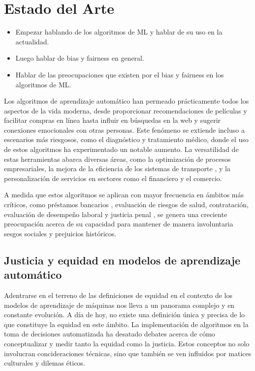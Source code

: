 \chapter{Estado del Arte}\label{chapter:state-of-the-art}

\begin{itemize}
    \item Empezar hablando de los algoritmos de ML y hablar de su uso en la actualidad.
    \item Luego hablar de bias y fairness en general.
    \item Hablar de las preocupaciones que existen por el bias y fairness en los algoritmos de ML.
\end{itemize}

Los algoritmos de aprendizaje autom\'atico han permeado pr\'acticamente todos los aspectos de la vida moderna,
desde proporcionar recomendaciones de pel\'iculas y facilitar compras en l\'inea hasta influir en b\'usquedas en la web
y sugerir conexiones emocionales con otras personas. Este fen\'omeno se extiende incluso a escenarios m\'as riesgosos,
como el diagn\'ostico y tratamiento m\'edico, donde el uso de estos algoritmos ha experimentado un notable aumento.
La versatilidad de estas herramientas abarca diversas \'areas, como la optimizaci\'on de procesos empresariales, la 
mejora de la eficiencia de los sistemas de transporte \cite{autonomous_driving}, y la personalizaci\'on de servicios en 
sectores como el financiero y el comercio.

A medida que estos algoritmos se aplican con mayor frecuencia en \'ambitos m\'as cr\'iticos, como
pr\'estamos bancarios \cite{fairness_def}, evaluaci\'on de riesgos de salud, contrataci\'on, evaluaci\'on de desempe\~no laboral y
justicia penal \cite{compas}, se genera una creciente preocupaci\'on acerca de su capacidad para mantener de manera involuntaria 
sesgos sociales y prejuicios hist\'oricos. 

\section{Justicia y equidad en modelos de aprendizaje autom\'atico}

Adentrarse en el terreno de las definiciones de equidad en el contexto de los modelos de aprendizaje de m\'aquinas nos lleva 
a un panorama complejo y en constante evoluci\'on. A d\'ia de hoy, no existe una definici\'on \'unica y precisa
de lo que constituye la equidad en este \'ambito. La implementaci\'on de algoritmos en la toma de decisiones automatizada ha desatado 
debates acerca de c\'omo conceptualizar y medir tanto la equidad como la justicia. Estos conceptos no solo involucran concideraciones 
t\'ecnicas, sino que tambi\'en se ven influidos por matices culturales y dilemas \'eticos.

